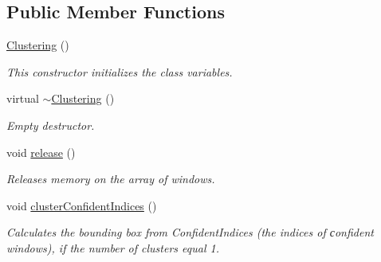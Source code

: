 \subsection*{Public Member Functions}
\begin{DoxyCompactItemize}
\item 
\hyperlink{classtld_1_1Clustering_ae900a3a513ddad5e5b2f5f49d25d8358}{Clustering} ()
\begin{DoxyCompactList}\small\item\em This constructor initializes the class variables. \end{DoxyCompactList}\item 
virtual \hyperlink{classtld_1_1Clustering_a86532276b1db43fc44ff201b385c4967}{$\sim$\-Clustering} ()
\begin{DoxyCompactList}\small\item\em Empty destructor. \end{DoxyCompactList}\item 
void \hyperlink{classtld_1_1Clustering_a2dbde4a94a483e8befe4b710445941bf}{release} ()
\begin{DoxyCompactList}\small\item\em Releases memory on the array of windows. \end{DoxyCompactList}\item 
void \hyperlink{classtld_1_1Clustering_a772750b3a1183ef80a9b4cf202e4c203}{cluster\-Confident\-Indices} ()
\begin{DoxyCompactList}\small\item\em Calculates the bounding box from Confident\-Indices (the indices of сonfident windows), if the number of clusters equal 1. \end{DoxyCompactList}\end{DoxyCompactItemize}

